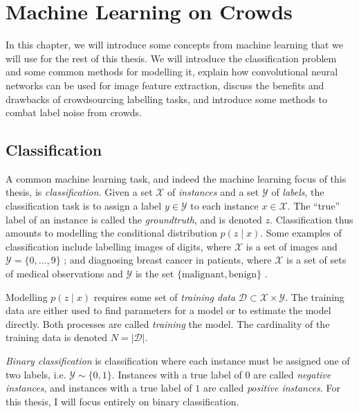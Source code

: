 \chapter{Machine Learning on Crowds}
\label{cha:ml}

In this chapter, we will introduce some concepts from machine learning that we
will use for the rest of this thesis. We will introduce the classification
problem and some common methods for modelling it, explain how convolutional
neural networks can be used for image feature extraction, discuss the benefits
and drawbacks of crowdsourcing labelling tasks, and introduce some methods to
combat label noise from crowds.

\section{Classification}
\label{sec:classification}
    
    A common machine learning task, and indeed the machine learning focus of
    this thesis, is \emph{classification}. Given a set $\mathcal X$ of
    \emph{instances} and a set $\mathcal Y$ of \emph{labels}, the classification
    task is to assign a label $y \in \mathcal Y$ to each instance $x \in
    \mathcal X$. The ``true'' label of an instance is called the
    \emph{groundtruth}, and is denoted $z$. Classification thus amounts to
    modelling the conditional distribution $p(z \mid x)$. Some examples of
    classification include labelling images of digits, where $\mathcal X$ is a
    set of images and $\mathcal Y = \{0, \dots, 9\}$ \citep{lecun98}; and
    diagnosing breast cancer in patients, where $\mathcal X$ is a set of sets
    of medical observations and $\mathcal Y$ is the set $\{\text{malignant},
    \text{benign}\}$ \citep{wolberg90}.

    Modelling $p(z \mid x)$ requires some set of \emph{training data} $\mathcal
    D \subset \mathcal X \times \mathcal Y$. The training data are either used
    to find parameters for a model or to estimate the model directly. Both
    processes are called \emph{training} the model. The cardinality of the
    training data is denoted $N = |\mathcal D|$.

    \emph{Binary classification} is classification where each instance must be
    assigned one of two labels, i.e. $\mathcal Y \sim \{0, 1\}$. Instances with
    a true label of $0$ are called \emph{negative instances}, and instances
    with a true label of $1$ are called \emph{positive instances}. For this
    thesis, I will focus entirely on binary classification.

